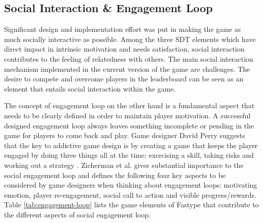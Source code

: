 \subsection{Social Interaction \& Engagement Loop}
Significant design and implementation effort was put in making the game as much socially interactive as possible. Among the three SDT elements which have direct impact in intrinsic motivation and needs satisfaction, social interaction contributes to the feeling of relatedness with others. The main social interaction mechanism implemented in the current version of the game are challenges. The desire to compete and overcome players in the leaderboard can be seen as an element that entails social interaction within the game. 

The concept of engagement loop on the other hand is a fundamental aspect that needs to be clearly defined in order to maintain player motivation. A successful designed engagement loop always leaves something incomplete or pending in the game for players to come back and play. Game designer David Perry suggests that the key to addictive game design is by creating a game that keeps the player engaged by doing three things all at the time: exercising a skill, taking risks and working out a strategy \cite{15}. Zicherman et al. \cite{48} gives substantial importance to the social engagement loop and defines the following four key aspects to be considered by game designers when thinking about engagement loops: motivating emotion, player re-engagement, social call to action and visible progress/rewards. Table \ref{tab:engagement-loop} lists the game elements of Fastype that contribute to the different aspects of social engagement loop.


